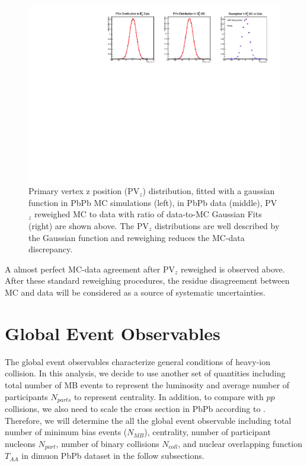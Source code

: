 \begin{figure}
\begin{center}
\includegraphics[width= 1.10\textwidth]{Figures/Chapter4/PVzWeightPbPb.pdf}
\caption{Primary vertex z position (PV$_{z}$) distribution, fitted with a gaussian function in PbPb MC simulations (left), in PbPb data (middle), PV$_{z}$ reweighed MC to data with ratio of data-to-MC Gaussian Fits (right) are shown above. The PV$_z$ distributions are well described by the Gaussian function and reweighing reduces the MC-data discrepancy.}
\label{PVZPlot}
\end{center}
\end{figure}

A almost perfect MC-data agreement after PV$_{z}$ reweighed is observed above. After these standard reweighing procedures, the residue disagreement between MC and data will be considered as a source of systematic uncertainties.


\clearpage

\section{Global Event Observables} 

The global event observables characterize general conditions of heavy-ion collision. In this analysis, we decide to use another set of quantities including total number of MB events to represent the luminosity and average number of participants $N_{parts}$ to represent centrality. In addition, to compare with $pp$ collisions, we also need to scale the cross section in PbPb according to . Therefore, we will determine the all the global event observable including total number of minimum bias events ($N_{MB}$), centrality, number of participant nucleons $N_{part}$, number of binary collisions $N_{coll}$, and nuclear overlapping function $T_{AA}$ in dimuon PbPb dataset in the follow subsections.

